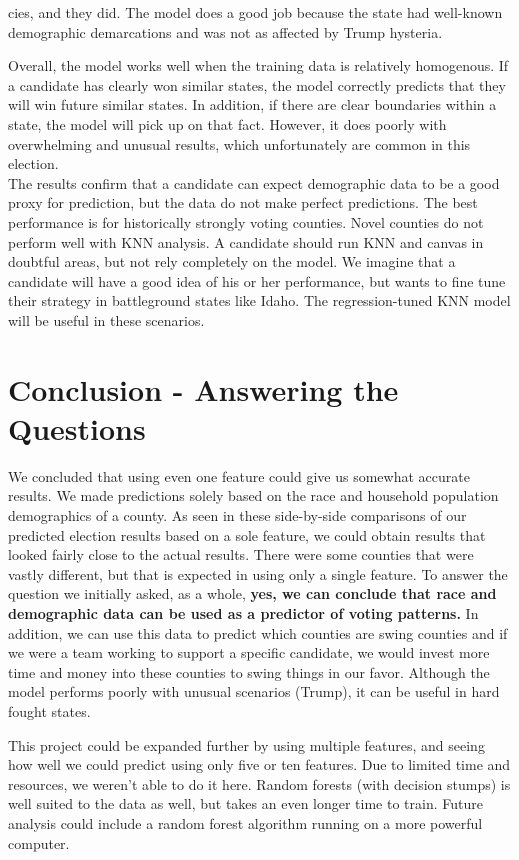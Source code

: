 \documentclass[11pt]{article}
\begin{document}
cies, and they did. The model does a good job because the state had well-known demographic demarcations and was not as affected by Trump hysteria. 

Overall, the model works well when the training data is relatively homogenous. If a candidate has clearly won similar states, the model correctly predicts that they will win future similar states. In addition, if there are clear boundaries within a state, the model will pick up on that fact. However, it does poorly with overwhelming and unusual results, which unfortunately are common in this election. \\

The results confirm that a candidate can expect demographic data to be a good proxy for prediction, but the data do not make perfect predictions. The best performance is for historically strongly voting counties. Novel counties do not perform well with KNN analysis. A candidate should run KNN and canvas in doubtful areas, but not rely completely on the model. We imagine that a candidate will have a good idea of his or her performance, but wants to fine tune their strategy in battleground states like Idaho. The regression-tuned KNN model will be useful in these scenarios. 


\section{Conclusion - Answering the Questions}
We concluded that using even one feature could give us somewhat accurate results. We made predictions solely based on the race and household population demographics of a county. As seen in these side-by-side comparisons of our predicted election results based on a sole feature, we could obtain results that looked fairly close to the actual results. There were some counties that were vastly different, but that is expected in using only a single feature. To answer the question we initially asked, as a whole, \textbf{yes, we can conclude that race and demographic data can be used as a predictor of voting patterns.} In addition, we can use this data to predict which counties are swing counties and if we were a team working to support a specific candidate, we would invest more time and money into these counties to swing things in our favor. Although the model performs poorly with unusual scenarios (Trump), it can be useful in hard fought states. 

This project could be expanded further by using multiple features, and seeing how well we could predict using only five or ten features. Due to limited time and resources, we weren’t able to do it here. Random forests (with decision stumps) is well suited to the data as well, but takes an even longer time to train. Future analysis could include a random forest algorithm running on a more powerful computer. 
\end{document}
